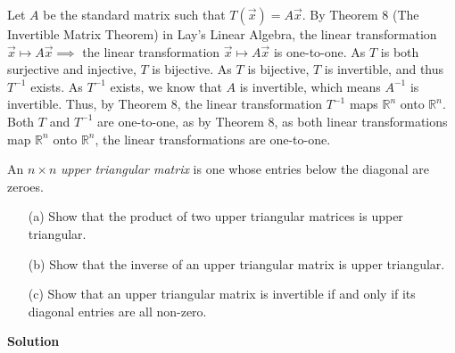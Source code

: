 \documentclass[11pt]{scrartcl}
\theoremstyle{dotlessP}
\theoremstyle{dotlessN}
\newcommand{\reals}{\mathbb{R}} %
\begin{document}
Let $A$ be the standard matrix such that $T(\vec{x}) = A\vec{x}$. By Theorem 8 (The Invertible Matrix Theorem) in Lay's Linear Algebra, the linear transformation $\vec{x} \mapsto A\vec{x} \implies$ the linear transformation $\vec{x} \mapsto A\vec{x}$ is one-to-one. As $T$ is both surjective and injective, $T$ is bijective. As $T$ is bijective, $T$ is invertible, and thus $T^{-1}$ exists. As $T^{-1}$ exists, we know that $A$ is invertible, which means $A^{-1}$ is invertible. Thus, by Theorem 8, the linear transformation $T^{-1}$ maps $\reals^{n}$ onto $\reals^{n}$. Both $T$ and $T^{-1}$ are one-to-one, as by Theorem 8, as both linear transformations map $\reals^{n}$ onto $\reals^{n}$, the linear transformations are one-to-one.
\begin{ques}
	An $n \times n$ \emph{upper triangular matrix} is one whose entries below the diagonal are zeroes.
    \begin{itemize}
        \item[(a)] Show that the product of two upper triangular matrices is upper triangular.
        \item[(b)] Show that the inverse of an upper triangular matrix is upper triangular. 
        \item[(c)] Show that an upper triangular matrix is invertible if and only if its diagonal entries are all non-zero.
    \end{itemize}
\end{ques}
\textbf{Solution}
\end{document}
